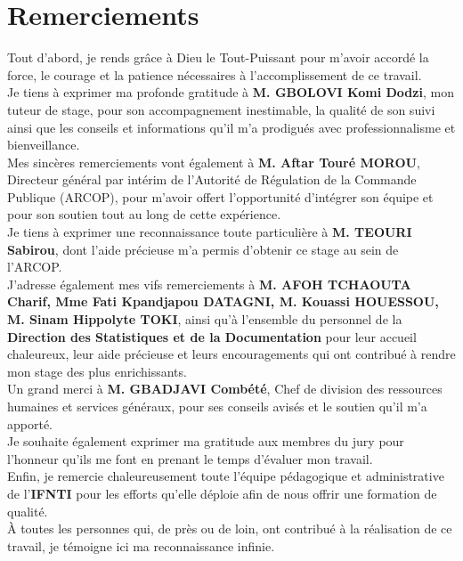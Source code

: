 \chapter*{Remerciements}


Tout d’abord, je rends grâce à Dieu le Tout-Puissant pour m’avoir accordé la force, le courage et la patience nécessaires à l’accomplissement de ce travail.\\

Je tiens à exprimer ma profonde gratitude à \textbf{M. GBOLOVI Komi Dodzi}, mon tuteur de stage, pour son accompagnement inestimable, la qualité de son suivi ainsi que les conseils et informations qu’il m’a prodigués avec professionnalisme et bienveillance.\\

Mes sincères remerciements vont également à \textbf{M. Aftar Touré MOROU}, Directeur général par intérim de l’Autorité de Régulation de la Commande Publique (ARCOP), pour m’avoir offert l’opportunité d’intégrer son équipe et pour son soutien tout au long de cette expérience.\\

Je tiens à exprimer une reconnaissance toute particulière à \textbf{M. TEOURI Sabirou}, dont l’aide précieuse m’a permis d’obtenir ce stage au sein de l’ARCOP.\\

J’adresse également mes vifs remerciements à \textbf{M. AFOH TCHAOUTA Charif, Mme Fati Kpandjapou DATAGNI, M. Kouassi HOUESSOU, M. Sinam Hippolyte TOKI}, ainsi qu’à l’ensemble du personnel de la \textbf{Direction des Statistiques et de la Documentation} pour leur accueil chaleureux, leur aide précieuse et leurs encouragements qui ont contribué à rendre mon stage des plus enrichissants.\\

Un grand merci à \textbf{M. GBADJAVI Combété}, Chef de division des ressources humaines et services généraux, pour ses conseils avisés et le soutien qu’il m’a apporté.\\

Je souhaite également exprimer ma gratitude aux membres du jury pour l’honneur qu’ils me font en prenant le temps d’évaluer mon travail.\\

Enfin, je remercie chaleureusement toute l’équipe pédagogique et administrative de l’\textbf{IFNTI} pour les efforts qu’elle déploie afin de nous offrir une formation de qualité.\\

À toutes les personnes qui, de près ou de loin, ont contribué à la réalisation de ce travail, je témoigne ici ma reconnaissance infinie.


\clearpage